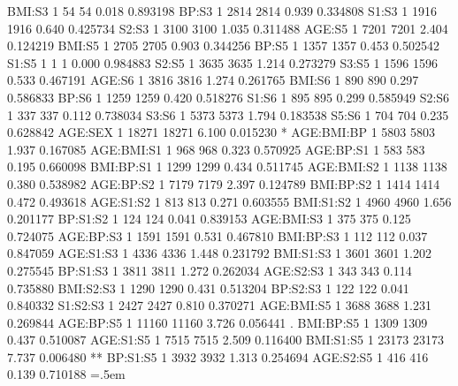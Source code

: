 \documentclass[runningheads]{llncs}
\newenvironment{lcverbatim}
 {\SaveVerbatim{cverb}}
 {\endSaveVerbatim
  \flushleft\fboxrule=0pt\fboxsep=.5em
  \colorbox{cverbbg}{%
    \makebox[\dimexpr\linewidth-2\fboxsep][l]{\BUseVerbatim{cverb}}%
  }
  \endflushleft
}
\begin{document}
\begin{lcverbatim}
BMI:S3                  1     54      54   0.018 0.893198    
BP:S3                   1   2814    2814   0.939 0.334808    
S1:S3                   1   1916    1916   0.640 0.425734    
S2:S3                   1   3100    3100   1.035 0.311488    
AGE:S5                  1   7201    7201   2.404 0.124219    
BMI:S5                  1   2705    2705   0.903 0.344256    
BP:S5                   1   1357    1357   0.453 0.502542    
S1:S5                   1      1       1   0.000 0.984883    
S2:S5                   1   3635    3635   1.214 0.273279    
S3:S5                   1   1596    1596   0.533 0.467191    
AGE:S6                  1   3816    3816   1.274 0.261765    
BMI:S6                  1    890     890   0.297 0.586833    
BP:S6                   1   1259    1259   0.420 0.518276    
S1:S6                   1    895     895   0.299 0.585949    
S2:S6                   1    337     337   0.112 0.738034    
S3:S6                   1   5373    5373   1.794 0.183538    
S5:S6                   1    704     704   0.235 0.628842    
AGE:SEX                 1  18271   18271   6.100 0.015230 *  
AGE:BMI:BP              1   5803    5803   1.937 0.167085    
AGE:BMI:S1              1    968     968   0.323 0.570925    
AGE:BP:S1               1    583     583   0.195 0.660098    
BMI:BP:S1               1   1299    1299   0.434 0.511745    
AGE:BMI:S2              1   1138    1138   0.380 0.538982    
AGE:BP:S2               1   7179    7179   2.397 0.124789    
BMI:BP:S2               1   1414    1414   0.472 0.493618    
AGE:S1:S2               1    813     813   0.271 0.603555    
BMI:S1:S2               1   4960    4960   1.656 0.201177    
BP:S1:S2                1    124     124   0.041 0.839153    
AGE:BMI:S3              1    375     375   0.125 0.724075    
AGE:BP:S3               1   1591    1591   0.531 0.467810    
BMI:BP:S3               1    112     112   0.037 0.847059    
AGE:S1:S3               1   4336    4336   1.448 0.231792    
BMI:S1:S3               1   3601    3601   1.202 0.275545    
BP:S1:S3                1   3811    3811   1.272 0.262034    
AGE:S2:S3               1    343     343   0.114 0.735880    
BMI:S2:S3               1   1290    1290   0.431 0.513204    
BP:S2:S3                1    122     122   0.041 0.840332    
S1:S2:S3                1   2427    2427   0.810 0.370271    
AGE:BMI:S5              1   3688    3688   1.231 0.269844    
AGE:BP:S5               1  11160   11160   3.726 0.056441 .  
BMI:BP:S5               1   1309    1309   0.437 0.510087    
AGE:S1:S5               1   7515    7515   2.509 0.116400    
BMI:S1:S5               1  23173   23173   7.737 0.006480 ** 
BP:S1:S5                1   3932    3932   1.313 0.254694    
AGE:S2:S5               1    416     416   0.139 0.710188    
\end{lcverbatim}
\end{document}
